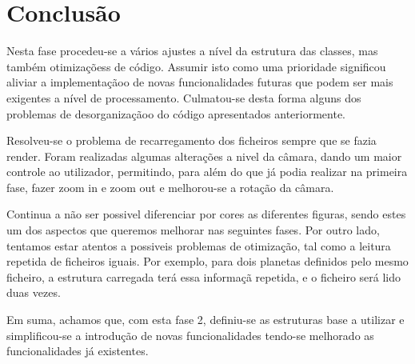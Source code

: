 \chapter{Conclusão}

Nesta fase procedeu-se a vários ajustes a nível da estrutura das classes, mas também otimizaçõess de código. Assumir isto como uma prioridade significou aliviar a implementaçãoo de novas funcionalidades futuras que podem
ser mais exigentes a nível de processamento. Culmatou-se desta forma alguns dos problemas de desorganizaçãoo do código apresentados anteriormente.

Resolveu-se o problema de recarregamento dos ficheiros sempre que se fazia render. Foram realizadas algumas alterações a nivel da câmara, dando um maior controle ao utilizador, permitindo, para além do que já podia realizar na primeira fase, fazer zoom in e zoom out e melhorou-se a rotação da câmara. 

Continua a não ser possivel diferenciar por cores as diferentes figuras, sendo estes um dos aspectos que queremos melhorar nas seguintes fases.
Por outro lado, tentamos estar atentos a possiveis  problemas de otimização, tal como a leitura repetida de ficheiros iguais. Por exemplo, para dois planetas definidos pelo mesmo ficheiro, a estrutura carregada terá essa informaçã repetida, e o ficheiro será lido duas vezes. 

Em suma, achamos que, com esta fase 2, definiu-se as estruturas base a utilizar e simplificou-se a introdução de novas funcionalidades tendo-se melhorado as funcionalidades já existentes.
